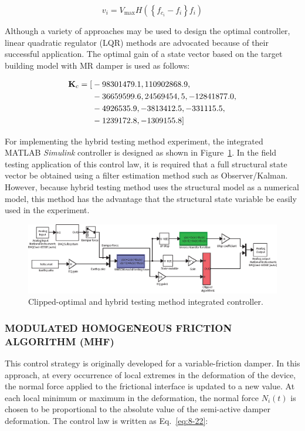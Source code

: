 \begin{equation}\label{eq:8-21}
v_{i} = V_{\text{max}}H\left(\left\{f_{c_{i}}-f_{i}\right\}f_{i}\right)
\end{equation}

Although a variety of approaches may be used to design the optimal controller, linear quadratic regulator (LQR) methods are advocated because of their successful application. The optimal gain of a state vector based on the target building model with MR damper is used as follows:

\begin{align*}
\mathbf{K}_{c} = [&-98301479.1,110902868.9,\\
&-36659599.6,24569454,5, -12841877.0,\\
&-4926535.9, -3813412.5, -331115.5,\\
&-1239172.8, -1309155.8]
\end{align*}

For implementing the hybrid testing method experiment, the integrated MATLAB \textit{Simulink} controller is designed as shown in Figure~\ref{fig:8-14}. In the field testing application of this control law, it is required that a full structural state vector be obtained using a filter estimation method such as Observer/Kalman. However, because hybrid testing method uses the structural model as a numerical model, this method has the advantage that the structural state variable be easily used in the experiment.

\begin{figure}[H]
\centering
\includegraphics[width=1\textwidth] {figure/8-14.eps}
\caption{Clipped-optimal and hybrid testing method integrated controller.}
\label{fig:8-14}
\end{figure}

\subsubsection{MODULATED HOMOGENEOUS FRICTION ALGORITHM (MHF)}

This control strategy is originally developed for a variable-friction damper. In this approach, at every occurrence of local extremes in the deformation of the device, the normal force applied to the frictional interface is updated to a new value. At each local minimum or maximum in the deformation, the normal force $N_{i}(t)$ is chosen to be proportional to the absolute value of the semi-active damper deformation. The control law is written as Eq.~\eqref{eq:8-22}\citep{inaudi1997modulated}:

